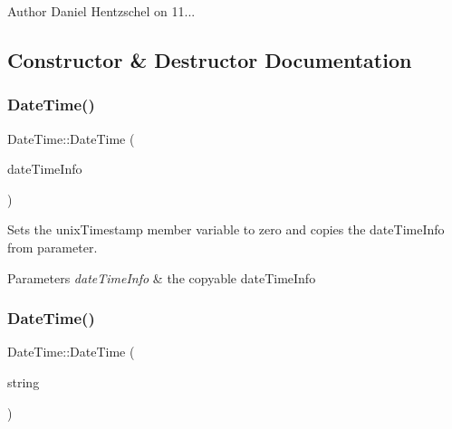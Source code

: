 \begin{DoxyAuthor}{Author}
Daniel Hentzschel on 11... 
\end{DoxyAuthor}


\subsection{Constructor \& Destructor Documentation}
\mbox{\label{class_date_time_acae25c3bcabd5636220ab73b4794b90e}} 
\subsubsection{\texorpdfstring{DateTime()}{DateTime()}\hspace{0.1cm}{\footnotesize\ttfamily [1/2]}}
{\footnotesize\ttfamily Date\+Time\+::\+Date\+Time (\begin{DoxyParamCaption}\item[{const \mbox{\hyperlink{struct_date_time_info}{Date\+Time\+Info}} \&}]{date\+Time\+Info }\end{DoxyParamCaption})}



Sets the unix\+Timestamp member variable to zero and copies the date\+Time\+Info from parameter. 


\begin{DoxyParams}{Parameters}
{\em date\+Time\+Info} & the copyable date\+Time\+Info \\
\hline
\end{DoxyParams}
\mbox{\label{class_date_time_aae5852ec64aa634b1e4a81effb7df049}} 
\subsubsection{\texorpdfstring{DateTime()}{DateTime()}\hspace{0.1cm}{\footnotesize\ttfamily [2/2]}}
{\footnotesize\ttfamily Date\+Time\+::\+Date\+Time (\begin{DoxyParamCaption}\item[{const \mbox{\hyperlink{class_a_string}{A\+String}} \&}]{string }\end{DoxyParamCaption})}



